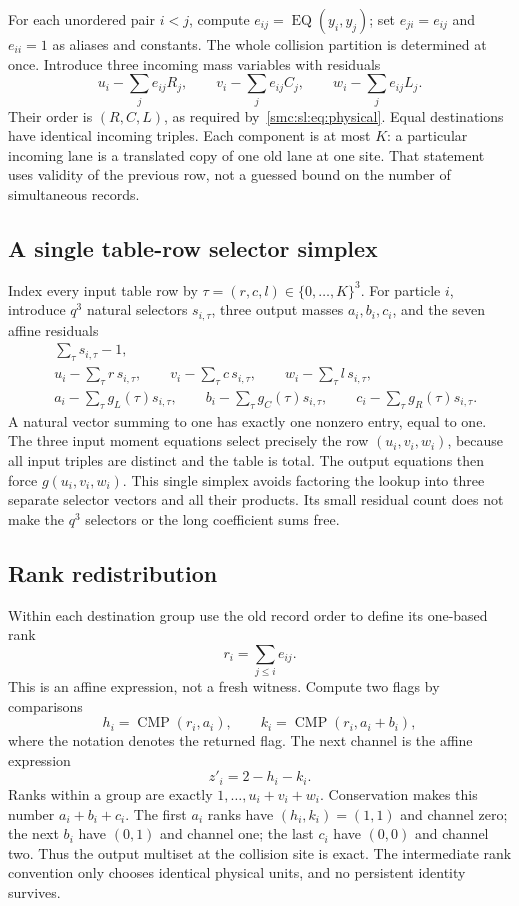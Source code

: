 \documentclass[11pt,letterpaper]{article}
\numberwithin{equation}{section}
\theoremstyle{definition}
\theoremstyle{remark}
\newcommand{\CMP}{\operatorname{CMP}}
\newcommand{\EQ}{\operatorname{EQ}}
\begin{document}
For each unordered pair $i<j$, compute $e_{ij}=\EQ(y_i,y_j)$; set $e_{ji}=e_{ij}$ and $e_{ii}=1$ as aliases and constants. The whole collision partition is determined at once. Introduce three incoming mass variables with residuals
\begin{equation}\label{smc:sl:eq:incoming}
 u_i-\sum_j e_{ij}R_j,\qquad
 v_i-\sum_j e_{ij}C_j,\qquad
 w_i-\sum_j e_{ij}L_j.
\end{equation}
Their order is $(R,C,L)$, as required by~\eqref{smc:sl:eq:physical}. Equal destinations have identical incoming triples. Each component is at most $K$: a particular incoming lane is a translated copy of one old lane at one site. That statement uses validity of the previous row, not a guessed bound on the number of simultaneous records.

\subsection{A single table-row selector simplex}
Index every input table row by $\tau=(r,c,l)\in\{0,\ldots,K\}^3$. For particle $i$, introduce $q^3$ natural selectors $s_{i,\tau}$, three output masses $a_i,b_i,c_i$, and the seven affine residuals
\begin{align}
 &\sum_\tau s_{i,\tau}-1,\nonumber\\
 &u_i-\sum_\tau r\,s_{i,\tau},\qquad
 v_i-\sum_\tau c\,s_{i,\tau},\qquad
 w_i-\sum_\tau l\,s_{i,\tau},\label{smc:sl:eq:table}\\
 &a_i-\sum_\tau g_L(\tau)s_{i,\tau},\qquad
 b_i-\sum_\tau g_C(\tau)s_{i,\tau},\qquad
 c_i-\sum_\tau g_R(\tau)s_{i,\tau}.\nonumber
\end{align}
A natural vector summing to one has exactly one nonzero entry, equal to one. The three input moment equations select precisely the row $(u_i,v_i,w_i)$, because all input triples are distinct and the table is total. The output equations then force $g(u_i,v_i,w_i)$. This single simplex avoids factoring the lookup into three separate selector vectors and all their products. Its small residual count does not make the $q^3$ selectors or the long coefficient sums free.

\subsection{Rank redistribution}
Within each destination group use the old record order to define its one-based rank
\[
 r_i=\sum_{j\le i}e_{ij}.
\]
This is an affine expression, not a fresh witness. Compute two flags by comparisons
\[
 h_i=\CMP(r_i,a_i),\qquad k_i=\CMP(r_i,a_i+b_i),
\]
where the notation denotes the returned flag. The next channel is the affine expression
\begin{equation}\label{smc:sl:eq:redistribute}
 z'_i=2-h_i-k_i.
\end{equation}
Ranks within a group are exactly $1,\ldots,u_i+v_i+w_i$. Conservation makes this number $a_i+b_i+c_i$. The first $a_i$ ranks have $(h_i,k_i)=(1,1)$ and channel zero; the next $b_i$ have $(0,1)$ and channel one; the last $c_i$ have $(0,0)$ and channel two. Thus the output multiset at the collision site is exact. The intermediate rank convention only chooses identical physical units, and no persistent identity survives.
\end{document}
